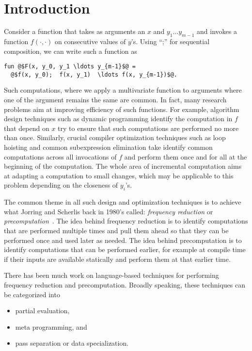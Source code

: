 \newcommand{\langname}{LAMDA12}
\section{Introduction}

Consider a function that takes as arguments an $x$ and $y_1 \ldots
y_{m-1}$ and invokes a function $f(\cdot, \cdot)$ on consecutive
values of $y$'s.  Using ``;'' for  sequential composition, we can
write such a function as
\begin{lstlisting}
fun @$F(x, y_0, y_1 \ldots y_{m-1}$@ = 
  @$f(x, y_0);  f(x, y_1)  \ldots f(x, y_{m-1})$@.
\end{lstlisting}
%

Such computations, where we apply a multivariate function to arguments
where one of the argument remains the same are common.  In fact, many
research problems aim at improving efficiency of such functions.  For
example, algorithm design techniques such as dynamic programming
identify the computation in $f$ that depend on $x$ try to ensure that
such computations are performed no more than once.  Similarly, crucial
compiler optimization techniques such as loop hoisting and common
subexpression elimination take identify common computations across all
invocations of $f$ and perform them once and for all at the beginning
of the computation. The whole area of incremental computation aims at
adapting a computation to small changes, which may be applicable to
this problem depending on the closeness of $y_i$'s.

The common theme in all such design and optimization techniques is to
achieve what Jorring and Scherlis back in 1980's called: {\em
  frequency reduction} or {\em precomputation}~\cite{JS86-staging}.
The idea behind frequency reduction is to identify computations that
are performed multiple times and pull them ahead so that they can be
performed once and used later as needed.  The idea behind
precomputation is to identify computations that can be performed
earlier, for example at compile time if their inputs are available
statically and perform them at that earlier time. 


There has been much work on language-based techniques for performing
frequency reduction and precomputation.  Broadly speaking, these
techniques can be categorized into
\begin{itemize}
\item 
partial evaluation,

\item
meta programming, and

\item 
pass separation or data specialization.

\end{itemize}

